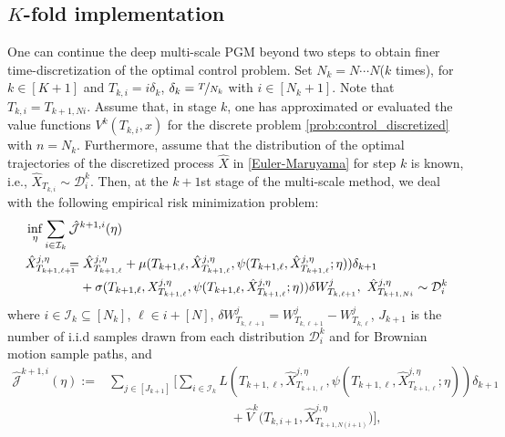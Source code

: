 \documentclass{article}
\numberwithin{equation}{section}
\begin{document}
\subsection{\texorpdfstring{$K$}{}-fold implementation}
One can continue the deep multi-scale PGM beyond two steps to obtain finer time-discretization of the optimal control problem. 
Set $N_{k}=N\cdots N$($k$ times), for $k\in[K+1]$ and $T_{k,i}=i\delta_k$, $\delta_k=\nicefrac{T}{N_k}$ with $i\in[N_k+1]$. Note that $T_{k,i}=T_{k+1,Ni}$.
Assume that, in stage $k$, one has approximated or evaluated the value functions $V^k(T_{k,i},x)$ for the discrete problem \eqref{prob:control_discretized} with $n=N_k$. Furthermore, assume that the distribution of the optimal trajectories of the discretized process $\hat{X}$  in \eqref{Euler-Maruyama} for step $k$ is known, i.e.,   $\hat{X}_{T_{k,i}}\sim \mathcal{D}^k_{i}$. Then, at the $k+1$st stage of the multi-scale method, we deal with the following empirical risk minimization problem:
\begin{align}
    &\inf_{\eta} \sum_{i\in\mathcal{I}_k}\hat{\mathcal{J}}^{k+1,i}(\eta)\\
   & \hat{X}^{j,\eta}_{T_{k+1,\ell+1}}\!\!\!\!\!=\hat{X}^{j,\eta}_{T_{k+1,\ell}}+\mu({T_{k+1,\ell}},\hat{X}^{j,\eta}_{T_{k+1,\ell}},\psi(T_{k+1,\ell},\hat{X}^{j,\eta}_{T_{k+1,\ell}};\eta))\delta_{k+1}\nonumber\\
   &\hspace{1.5cm} +\sigma({T_{k+1,\ell}},X^{j,\eta}_{T_{k+1,\ell}},\psi(T_{k+1,\ell},\hat{X}^{j,\eta}_{T_{k+1,\ell}};\eta))\delta W^j_{{T_{k,\ell+1}}},~\hat{X}^{j,\eta}_{T_{k+1,Ni}}\sim\mathcal{D}^k_{i}
\end{align}
where $i\in\mathcal{I}_k\subseteq [N_k]$, $\ell\in i+[N]$, $\delta W^j_{{T_{k,\ell+1}}}= W^j_{{T_{k,\ell+1}}}- W^j_{{T_{k,\ell}}}$, $J_{k+1}$ is the number of i.i.d samples drawn from each distribution $\mathcal{D}^k_{i}$ and for Brownian motion sample paths, and
\begin{equation}
\begin{split}
     \hat{\mathcal{J}}^{k+1,i}(\eta):=&\sum_{j\in[J_{k+1}]}\bigg[\sum_{i\in\mathcal{I}_k}L(T_{k+1,\ell},\hat{X}^{j,\eta}_{T_{k+1,\ell}},\psi(T_{k+1,\ell},\hat{X}^{j,\eta}_{T_{k+1,\ell}};\eta))\delta_{k+1}\\
     &\hspace{4cm} +\hat{V}^k\Big(T_{k,i+1},\hat{X}^{j,\eta}_{T_{k+1,N(i+1)}}\Big)\bigg],
\end{split}
\end{equation}
\end{document}

